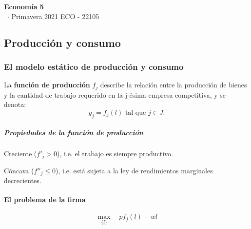 \documentclass[8pt,a4paper]{extarticle}
\renewcommand{\csClass}{Economía 5}
\renewcommand{\csClassCode}{ECO - 22105}
\renewcommand{\csTerm}{Primavera 2021}
\begin{document}
\begin{titlepage}
    \begin{center}
	\vspace*{1cm}
	\Huge
        \textbf{\csClass}
	\vspace{0.5cm} \\
	\Large
        \cs\ $\cdot$ \csTerm
        \vfill
        \csAuthorName
	\vspace{0.8cm}
        \csClassCode\\
        \csSchool     
    \end{center}
\end{titlepage}

\begin{multicols}{3}
\setcounter{page}{1}

\part{Producción y consumo}

\section{El modelo estático de producción y consumo}

\begin{boxdef}
	La \textbf{función de producción} $f_j$ describe la relación entre la producción de bienes y la cantidad de trabajo requerido en la j-ésima empresa competitiva, y se denota:
	\[
		y_j = f_j(l) \text{ tal que } j \in J
	.\]
\end{boxdef}

\subsubsection*{Propiedades de la función de producción}

\begin{eqlist}
\item Creciente ($f'_j > 0$), i.e. el trabajo es siempre productivo.
\item Cóncava ($f''_j \le 0$), i.e. está sujeta a la ley de rendimientos marginales decrecientes.
\end{eqlist}

\subsection{El problema de la firma}

\begin{equation*}
	\max_{\{l\}} \quad pf_j (l) - wl
\end{equation*}


\end{multicols}
\end{document}
